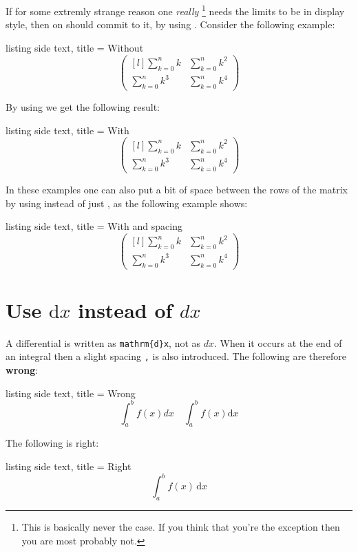 \documentclass[a4paper, 10pt, headings=standardclasses, oneside, bibliography=totocnumbered]{scrbook}
\begin{document}
If for some extremly strange reason one \textit{really}%
\footnote{This is basically never the case.
If you think that you’re the exception then you are most probably not.}
needs the limits to be in display style, then on should commit to it, by using .
Consider the following example:
\begin{tcblisting}{listing side text, title = {Without }}
\[
  \begin{pmatrix*}[l]
      \sum_{k=0}^n k
    & \sum_{k=0}^n k^2
    \\
      \sum_{k=0}^n k^3
    & \sum_{k=0}^n k^4
  \end{pmatrix*}
\]
\end{tcblisting}
By using  we get the following result:
\begin{tcblisting}{listing side text, title = {With }}
\[
  \begin{pmatrix*}[l]
      \displaystyle \sum_{k=0}^n k
    & \displaystyle \sum_{k=0}^n k^2
    \\
      \displaystyle \sum_{k=0}^n k^3
    & \displaystyle \sum_{k=0}^n k^4
  \end{pmatrix*}
\]
\end{tcblisting}
In these examples one can also put a bit of space between the rows of the matrix by using \texttt{\tbs\tbs[height]} instead of just \texttt{\tbs\tbs}, as the following example shows:
\begin{tcblisting}{listing side text, title = {With  and spacing}}
\[
  \begin{pmatrix*}[l]
      \displaystyle \sum_{k=0}^n k
    & \displaystyle \sum_{k=0}^n k^2
    \\[1.6em]
      \displaystyle \sum_{k=0}^n k^3
    & \displaystyle \sum_{k=0}^n k^4
  \end{pmatrix*}
\]
\end{tcblisting}





\section{Use \texorpdfstring{$\mathrm{d}x$}{dx} instead of \texorpdfstring{$dx$}{dx}}

A differential is written as \texttt{{\tbs}mathrm\{d\}x}, not as $dx$.
When it occurs at the end of an integral then a slight spacing \texttt{{\tbs},} is also introduced.
The following are therefore \textbf{wrong}:
\begin{tcblisting}{listing side text, title = {Wrong}}
\[
  \int_a^b f(x) dx
  \quad
  \int_a^b f(x) \mathrm{d}x
\]
\end{tcblisting}
The following is right:
\begin{tcblisting}{listing side text, title = {Right}}
\[
  \int_a^b f(x) \,\mathrm{d}x
\]
\end{tcblisting}
\end{document}
